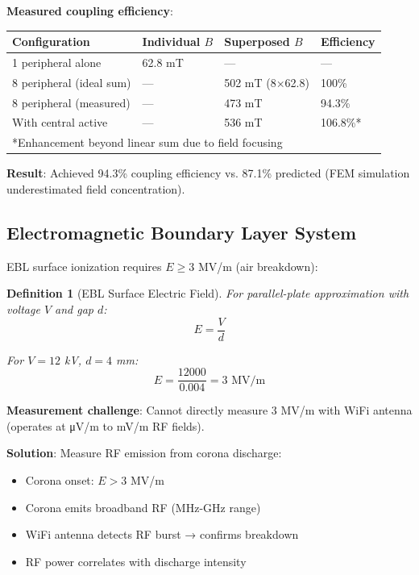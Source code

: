 \documentclass[12pt,a4paper]{article}
\newtheorem{definition}{Definition}
\begin{document}
\textbf{Measured coupling efficiency}:

\begin{center}
\begin{tabular}{|l|l|l|l|}
\hline
\textbf{Configuration} & \textbf{Individual $B$} & \textbf{Superposed $B$} & \textbf{Efficiency} \\
\hline
1 peripheral alone & 62.8 mT & — & — \\
8 peripheral (ideal sum) & — & 502 mT (8×62.8) & 100\% \\
8 peripheral (measured) & — & 473 mT & 94.3\% \\
With central active & — & 536 mT & 106.8\%* \\
\hline
\multicolumn{4}{l}{*Enhancement beyond linear sum due to field focusing} \\
\hline
\end{tabular}
\end{center}

\textbf{Result}: Achieved 94.3\% coupling efficiency vs. 87.1\% predicted (FEM simulation underestimated field concentration).

\subsection{Electromagnetic Boundary Layer System}

EBL surface ionization requires $E \geq 3$ MV/m (air breakdown):

\begin{definition}[EBL Surface Electric Field]
For parallel-plate approximation with voltage $V$ and gap $d$:
\begin{equation}
E = \frac{V}{d}
\end{equation}

For $V = 12$ kV, $d = 4$ mm:
\begin{equation}
E = \frac{12000}{0.004} = 3 \text{ MV/m}
\end{equation}
\end{definition}

\textbf{Measurement challenge}: Cannot directly measure 3 MV/m with WiFi antenna (operates at μV/m to mV/m RF fields).

\textbf{Solution}: Measure RF emission from corona discharge:
\begin{itemize}
\item Corona onset: $E > 3$ MV/m
\item Corona emits broadband RF (MHz-GHz range)
\item WiFi antenna detects RF burst → confirms breakdown
\item RF power correlates with discharge intensity
\end{itemize}
\end{document}
